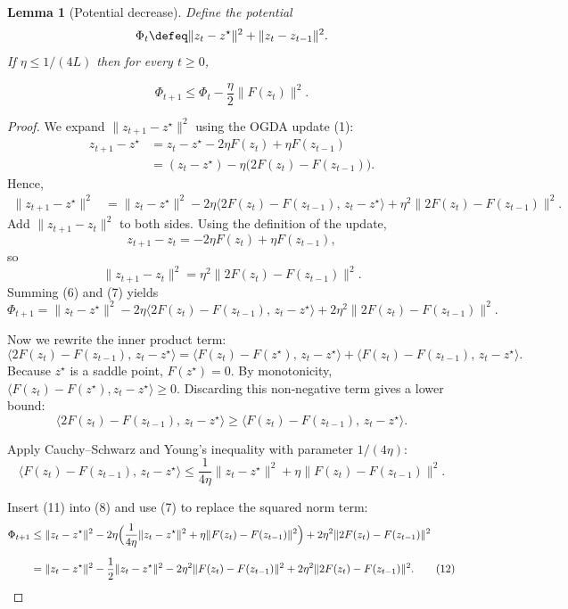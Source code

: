 \documentclass{article}
\newtheorem{lemma}{Lemma}
\begin{document}
\begin{lemma}[Potential decrease]\label{lem:potential}
Define the potential
\[
\Phi_t\defeq\|z_t-z^{\star}\|^{2}+ \|z_t-z_{t-1}\|^{2}.
\]
If \(\eta\le 1/(4L)\) then for every \(t\ge0\),

\[
\Phi_{t+1}\le \Phi_{t}-\frac{\eta}{2}\|F(z_t)\|^{2}. \tag{5}
\]
\end{lemma}
\begin{proof}
We expand \(\|z_{t+1}-z^{\star}\|^{2}\) using the OGDA update (1):
\[
\begin{aligned}
z_{t+1}-z^{\star}
&=z_{t}-z^{\star}-2\eta F(z_{t})+\eta F(z_{t-1})\\
&= (z_{t}-z^{\star})- \eta\bigl(2F(z_{t})-F(z_{t-1})\bigr).
\end{aligned}
\]
Hence,
\[
\begin{aligned}
\|z_{t+1}-z^{\star}\|^{2}
&=\|z_{t}-z^{\star}\|^{2}
-2\eta\langle 2F(z_{t})-F(z_{t-1}),\,z_{t}-z^{\star}\rangle
+\eta^{2}\|2F(z_{t})-F(z_{t-1})\|^{2}. \tag{6}
\end{aligned}
\]
Add \(\|z_{t+1}-z_{t}\|^{2}\) to both sides.  Using the definition of the update,
\[
z_{t+1}-z_{t}= -2\eta F(z_{t})+\eta F(z_{t-1}),
\]
so
\[
\|z_{t+1}-z_{t}\|^{2}= \eta^{2}\|2F(z_{t})-F(z_{t-1})\|^{2}. \tag{7}
\]
Summing (6) and (7) yields
\[
\Phi_{t+1}= \|z_{t}-z^{\star}\|^{2}
-2\eta\langle 2F(z_{t})-F(z_{t-1}),\,z_{t}-z^{\star}\rangle
+2\eta^{2}\|2F(z_{t})-F(z_{t-1})\|^{2}. \tag{8}
\]

Now we rewrite the inner product term:
\[
\langle 2F(z_{t})-F(z_{t-1}),\,z_{t}-z^{\star}\rangle
= \langle F(z_{t})-F(z^{\star}),\,z_{t}-z^{\star}\rangle
+ \langle F(z_{t})-F(z_{t-1}),\,z_{t}-z^{\star}\rangle. \tag{9}
\]
Because \(z^{\star}\) is a saddle point, \(F(z^{\star})=0\). By monotonicity,
\(\langle F(z_{t})-F(z^{\star}),z_{t}-z^{\star}\rangle\ge0\).  
Discarding this non‑negative term gives a lower bound:
\[
\langle 2F(z_{t})-F(z_{t-1}),\,z_{t}-z^{\star}\rangle
\ge \langle F(z_{t})-F(z_{t-1}),\,z_{t}-z^{\star}\rangle. \tag{10}
\]

Apply Cauchy–Schwarz and Young’s inequality with parameter \(1/(4\eta)\):
\[
\langle F(z_{t})-F(z_{t-1}),\,z_{t}-z^{\star}\rangle
\le \frac{1}{4\eta}\|z_{t}-z^{\star}\|^{2}
+ \eta\|F(z_{t})-F(z_{t-1})\|^{2}. \tag{11}
\]

Insert (11) into (8) and use (7) to replace the squared norm term:
\[
\begin{aligned}
\Phi_{t+1}
&\le \|z_{t}-z^{\star}\|^{2}
-2\eta\Bigl(\frac{1}{4\eta}\|z_{t}-z^{\star}\|^{2}
+ \eta\|F(z_{t})-F(z_{t-1})\|^{2}\Bigr)
+2\eta^{2}\|2F(z_{t})-F(z_{t-1})\|^{2}\\[0.2cm]
&= \|z_{t}-z^{\star}\|^{2}
-\frac12\|z_{t}-z^{\star}\|^{2}
-2\eta^{2}\|F(z_{t})-F(z_{t-1})\|^{2}
+2\eta^{2}\|2F(z_{t})-F(z_{t-1})\|^{2}. \tag{12}
\end{aligned}
\]


\end{proof}
\end{document}
